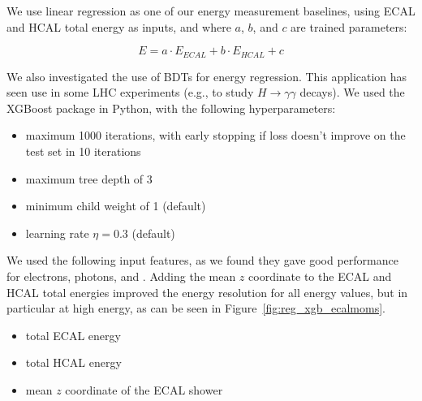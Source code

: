 We use linear regression as one of our energy measurement baselines, using ECAL and HCAL total energy as inputs, and where $a$, $b$, and $c$ are trained parameters:

\begin{equation}
E = a \cdot E_{ECAL} + b \cdot E_{HCAL} + c
\label{eq:linreg}
\end{equation}

We also investigated the use of BDTs for energy regression. This application has seen use in some LHC experiments (e.g., to study $H \rightarrow \gamma\gamma$ decays).  We used the XGBoost package in Python, with the following hyperparameters:

\begin{itemize}
\item maximum 1000 iterations, with early stopping if loss doesn't improve on the test set in 10 iterations
\item maximum tree depth of 3
\item minimum child weight of 1 (default)
\item learning rate $\eta = 0.3$ (default)
\end{itemize}

We used the following input features, as we found they gave good performance for electrons, photons, and \pizero. Adding the mean $z$ coordinate to the ECAL and HCAL total energies improved the energy resolution for all energy values, but in particular at high energy, as can be seen in Figure~\ref{fig:reg_xgb_ecalmoms}.

\begin{itemize}
\item total ECAL energy
\item total HCAL energy
\item mean $z$ coordinate of the ECAL shower
\end{itemize}


